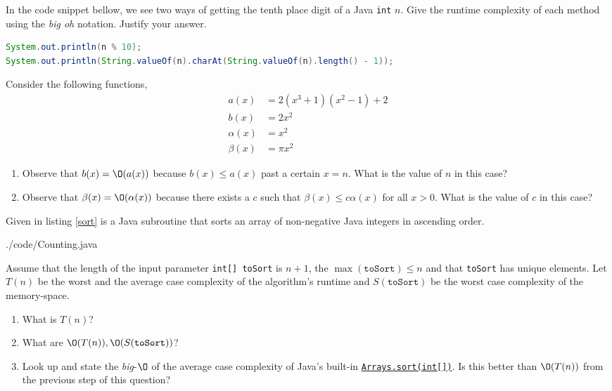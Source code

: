 \documentclass{homework}
\begin{document}
\question In the code snippet bellow, we see two ways of getting the tenth
place digit of a Java \texttt{int} $n$. Give the runtime
complexity of each method using the \textit{big oh} notation.
Justify your answer.
\begin{lstlisting}[language=java]
System.out.println(n % 10);
System.out.println(String.valueOf(n).charAt(String.valueOf(n).length() - 1));
\end{lstlisting}


\question Consider the following functions,
\begin{align*}
  a(x)      & = 2(x^3+1)(x^2-1)+2 \\
  b(x)      & = 2x^2              \\
  \alpha(x) & = x^2               \\
  \beta(x)  & = \pi x^2
\end{align*}
\begin{enumerate}
  \item Observe that $b(x) = \O(a(x))$ because $b(x) \leq a(x)$ past a
        certain $x=n$. What is the value of $n$ in this case?


  \item Observe that $\beta(x) = \O(\alpha(x))$ because there exists a $c$
        such that $\beta(x) \leq c\alpha(x)$ for all $x > 0$. What is the
        value of $c$ in this case?


\end{enumerate}

\question Given in listing \ref{sort} is a Java subroutine that sorts an
array of non-negative Java integers in ascending order.


{./code/Counting.java}

Assume that the length of the input parameter \texttt{int[]
  toSort} is $n + 1$, the ${\max(\texttt{toSort}) \leq n}$ and that
\texttt{toSort} has unique elements. Let $T(n)$ be the worst and
the average case complexity of the algorithm's runtime and
$S(\texttt{toSort})$ be the worst case complexity of the
memory-space.

\begin{enumerate}
  \item What is $T(n)$?


  \item What are $\O(T(n)), \O(S(\texttt{toSort}))$?


  \item Look up and state the \textit{big}-$\O$ of the average case
        complexity of Java's built-in
        \href{https://tinyurl.com/jw75mfa}{\texttt{Arrays.sort(int[])}}.
        Is this better than $\O(T(n))$ from the previous step of this question?

\end{enumerate}
\end{document}
